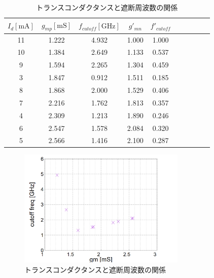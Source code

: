 \documentclass[twocolumn]{jsarticle}
\begin{document}
    \begin{table}[h]
        \caption{トランスコンダクタンスと遮断周波数の関係}
        \label{table:gm_cutoff}
        \centering
        \begin{tabular}{cccccccccc}
            $I_{d}[\mathrm{mA}]$ & $g_{mp}[\mathrm{mS}]$ & $f_{cutoff}[\mathrm{GHz}]$ &$g\prime_{mn}$ & $f\prime_{cutoff}$\\
            \hline\hline
            11 & 1.222 & 4.932 & 1.000 & 1.000\\
            10 & 1.384 & 2.649 & 1.133 & 0.537\\
            9 & 1.594 & 2.265 & 1.304 & 0.459\\
            3 & 1.847 & 0.912 & 1.511 & 0.185\\
            8 & 1.868 & 2.000 & 1.529 & 0.406\\
            7 & 2.216 & 1.762 & 1.813 & 0.357\\
            4 & 2.309 & 1.213 & 1.890 & 0.246\\
            6 & 2.547 & 1.578 & 2.084 & 0.320\\
            5 & 2.566 & 1.416 & 2.100 & 0.287\\
        \end{tabular}
    \end{table}

    \begin{figure}[h]
        \begin{center}
            \includegraphics*[width=80mm]{graphes/bitmap/gmp_cutoff.PNG}
            \caption{トランスコンダクタンスと遮断周波数の関係}
            \label{fig:gm_cutoff}
        \end{center}
    \end{figure}


    
\end{document}
